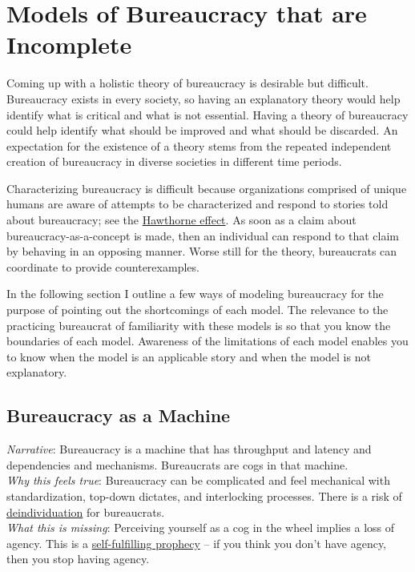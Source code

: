 \section{Models of Bureaucracy that are Incomplete\label{sec:models-of-bureaucracy}}

Coming up with a holistic theory of bureaucracy is desirable but difficult. Bureaucracy exists in every society, so having an explanatory theory would help identify what is critical and what is not essential. Having a theory of bureaucracy could help identify what should be improved and what should be discarded. An expectation for the existence of a theory stems from the repeated independent creation of bureaucracy in diverse societies in different time periods. 

Characterizing bureaucracy is difficult because organizations comprised of unique humans are aware of attempts to be characterized and respond to stories told about bureaucracy; see the \href{https://en.wikipedia.org/wiki/Hawthorne_effect}{Hawthorne effect}. As soon as a claim about bureaucracy-as-a-concept is made, then an individual can respond to that claim by behaving in an opposing manner. Worse still for the theory, bureaucrats can coordinate to provide counterexamples. 

In the following section I outline a few ways of modeling bureaucracy for the purpose of pointing out the shortcomings of each model. The relevance to the practicing bureaucrat of familiarity with these models is so that you know the boundaries of each model. Awareness of the limitations of each model enables you to know when the model is an applicable story and when the model is not explanatory. 

\subsection*{Bureaucracy as a Machine}

\textit{Narrative}: Bureaucracy is a machine that has throughput and latency and dependencies and mechanisms. Bureaucrats are cogs in that machine.\\
\textit{Why this feels true}: Bureaucracy can be complicated and feel mechanical with standardization, top-down dictates, and interlocking processes. There is a risk of \href{https://en.wikipedia.org/wiki/Deindividuation}{deindividuation} for bureaucrats. \\
\textit{What this is missing}: Perceiving yourself as a cog in the wheel implies a loss of agency. This is a \href{https://en.wikipedia.org/wiki/Self-fulfilling_prophecy}{self-fulfilling prophecy} -- if you think you don't have agency, then you stop having agency. 

